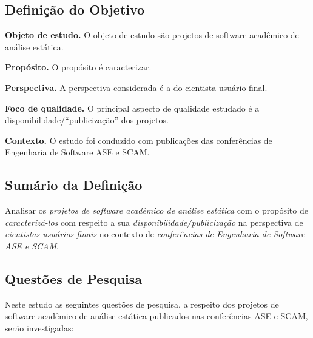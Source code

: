 \subsection{Definição do Objetivo}

\begin{description}
  \item{\bf Objeto de estudo.}
     O objeto de estudo são projetos de software acadêmico de análise estática.
  \item{\bf Propósito.}
    O propósito é caracterizar.
  \item{\bf Perspectiva.}
    A perspectiva considerada é a do cientista usuário final.
  \item{\bf Foco de qualidade.}
    O principal aspecto de qualidade estudado é a disponibilidade/``publicização'' dos projetos.
  \item{\bf Contexto.}
    O estudo foi conduzido com publicações das conferências de Engenharia de Software ASE e SCAM.
\end{description}

\subsection{Sumário da Definição}

Analisar os \textit{projetos de software acadêmico de análise estática}
com o propósito de \textit{caracterizá-los} 
com respeito a sua \textit{disponibilidade/publicização}
na perspectiva de \textit{cientistas usuários finais}
no contexto de \textit{conferências de Engenharia de Software ASE e SCAM}.

\subsection{Questões de Pesquisa}

Neste estudo as seguintes questões de pesquisa, a respeito dos projetos de
software acadêmico de análise estática publicados nas conferências ASE e SCAM,
serão investigadas:

\newcommand{\EstudoUmQuestaoUm}{
  Os projetos de software acadêmico de análise estática publicados nas conferências ASE e SCAM possuem alguma presença oficial online?
}
\newcommand{\EstudoUmQuestaoDois}{
  Os projetos de software academico de análise estática publicados nas conferências ASE e SCAM estão disponíveis para download?
}
\newcommand{\EstudoUmQuestaoTres}{
  É possível ter acesso ao código fonte dos projetos de software de análise estática publicados nas conferências ASE e SCAM?
}
\newcommand{\EstudoUmQuestaoQuatro}{
  Os projetos de software com código fonte disponível podem ser adaptados para atender necessidades emergentes?
}

